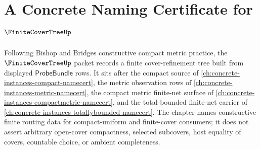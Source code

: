 \chapter{A Concrete Naming Certificate for $\FiniteCoverTreeUp$}
\label{ch:concrete-instances-finite-cover-tree-namecert}

Following Bishop and Bridges constructive compact metric practice, the $\FiniteCoverTreeUp$ packet records a finite cover-refinement tree built from displayed $\mathsf{ProbeBundle}$ rows. It sits after the compact source of \autoref{ch:concrete-instances-compact-namecert}, the metric observation rows of \autoref{ch:concrete-instances-metric-namecert}, the compact metric finite-net surface of \autoref{ch:concrete-instances-compactmetric-namecert}, and the total-bounded finite-net carrier of \autoref{ch:concrete-instances-totallybounded-namecert}. The chapter names constructive finite routing data for compact-uniform and finite-cover consumers; it does not assert arbitrary open-cover compactness, selected subcovers, host equality of covers, countable choice, or ambient completeness.


